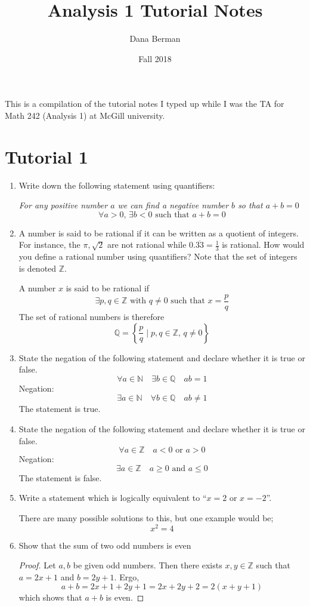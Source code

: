 \documentclass[12pt, reqno]{article}
\title{Analysis 1 Tutorial Notes}
\author{Dana Berman}
\date{Fall 2018}
\numberwithin{equation}{section}
\theoremstyle{definition}
\theoremstyle{remark}
\newcommand{\NN}{\mathbb{N}}
\newcommand{\QQ}{\mathbb{Q}}
\newcommand{\ZZ}{\mathbb{Z}}
\newcommand{\set}[1]{\left\{#1\right\}}
\begin{document}
\maketitle

This is a compilation of the tutorial notes I typed up while I was the TA for Math 242 (Analysis 1) at McGill university.

\section*{Tutorial 1}

\begin{enumerate}[leftmargin=*]
	\item Write down the following statement using quantifiers:

	      \emph{For any positive number $a$ we can find a negative number $b$ so that $a+b = 0$}
	      \[
		      \forall a > 0, \, \exists b < 0 \text{ such that } a+b = 0
	      \]
	\item A number is said to be rational if it can be written as a quotient of integers. For instance, the $\pi, \sqrt{2}$ are not rational while $0.\overline{33} = \frac{1}{3}$ is rational. How would you define a rational number using quantifiers? Note that the set of integers is denoted $\ZZ$.

	      A number $x$ is said to be rational if
	      \[
		      \exists p, q \in \ZZ \text{ with } q\neq 0 \text{ such that } x = \frac{p}{q}
	      \]
	      The set of rational numbers is therefore
	      \[
		      \QQ = \set{\frac{p}{q} \mid p, q \in \ZZ,\, q \neq 0}
	      \]
	\item State the negation of the following statement and declare whether it is true or false.
	      \[
		      \forall a \in \NN \quad\exists b \in \QQ \quad ab = 1
	      \]
	      Negation:
	      \[
		      \exists a\in \NN \quad \forall b \in \QQ \quad ab \neq 1
	      \]
	      The statement is true.
	\item State the negation of the following statement and declare whether it is true or false.
	      \[
		      \forall a \in \ZZ \quad a< 0 \text{ or } a>0
	      \]
	      Negation:
	      \[
		      \exists a \in \ZZ \quad a \geq 0 \text{ and } a\leq 0
	      \]
	      The statement is false.
	\item Write a statement which is logically equivalent to ``$x=2$ or $x=-2$''.

	      There are many possible solutions to this, but one example would be;
	      \[
		      x^2 = 4
	      \]
	\item Show that the sum of two odd numbers is even
	      \begin{proof}
		      Let $a,b$ be given odd numbers. Then there exists $x,y\in \ZZ$ such that $a = 2x+1$ and $b = 2y+1$. Ergo,
		      \[
			      a+b = 2x+1+2y+1 = 2x+2y+2 = 2(x+y+1)
		      \]
		      which shows that $a+b$ is even.
	      \end{proof}


\end{enumerate}
\end{document}
